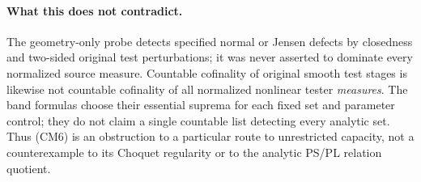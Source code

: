 \paragraph{What this does not contradict.}
The geometry-only probe detects specified normal or Jensen defects
by closedness and two-sided original test perturbations; it was
never asserted to dominate every normalized source measure.
Countable cofinality of original smooth test stages is likewise
not countable cofinality of all normalized nonlinear tester
\emph{measures}. The band formulas choose their essential
suprema for each fixed set and parameter control; they do not
claim a single countable list detecting every analytic set.
Thus (CM6) is an obstruction to a particular route to unrestricted
capacity, not a counterexample to its Choquet regularity or to
the analytic PS/PL relation quotient.
